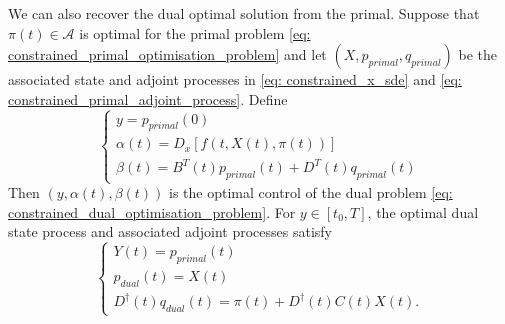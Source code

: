 We can also recover the dual optimal solution from the primal. Suppose that $\pi(t) \in \mathcal{A}$ is optimal for the primal problem \eqref{eq: constrained_primal_optimisation_problem} and let $(X, p_{primal}, q_{primal})$ be the associated state and adjoint processes in \eqref{eq: constrained_x_sde} and \eqref{eq: constrained_primal_adjoint_process}. Define
\begin{equation*}
    \begin{cases}
        y = p_{primal}(0)\\
        \alpha(t) = D_x[f(t, X(t), \pi(t))]\\
        \beta(t) = B^T(t) p_{primal}(t) + D^T(t) q_{primal}(t)
    \end{cases}
\end{equation*}
Then $(y, \alpha(t), \beta(t))$ is the optimal control of the dual problem \eqref{eq: constrained_dual_optimisation_problem}. For $y \in [t_0, T]$, the optimal dual state process and associated adjoint processes satisfy
\begin{equation*}
    \begin{cases}
        Y(t) = p_{primal}(t)\\
        p_{dual}(t) = X(t)\\
        D^\dagger(t) q_{dual} (t) = \pi(t) + D^\dagger (t) C(t) X(t).
    \end{cases}
\end{equation*}
















